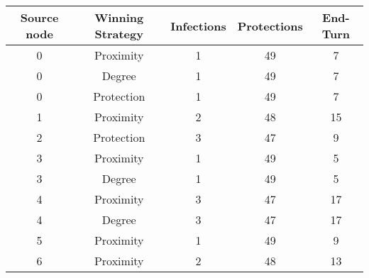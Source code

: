 \documentclass[results.tex]{subfiles}
\begin{document}
    \begin{center}
        \begin{tabular}{| c || c | c | c | c |}
            \hline
            {\bfseries Source node} & {\bfseries Winning Strategy} & {\bfseries Infections} & {\bfseries Protections}
            & {\bfseries End-Turn}
            \\  %
            \hline\hline
            0                       & Proximity                    & 1                      & 49                      & 7                    \\
            \hline
            0                       & Degree                       & 1                      & 49                      & 7                    \\
            \hline
            0                       & Protection                   & 1                      & 49                      & 7                    \\
            \hline
            1                       & Proximity                    & 2                      & 48                      & 15                   \\
            \hline
            2                       & Protection                   & 3                      & 47                      & 9                    \\
            \hline
            3                       & Proximity                    & 1                      & 49                      & 5                    \\
            \hline
            3                       & Degree                       & 1                      & 49                      & 5                    \\
            \hline
            4                       & Proximity                    & 3                      & 47                      & 17                   \\
            \hline
            4                       & Degree                       & 3                      & 47                      & 17                   \\
            \hline
            5                       & Proximity                    & 1                      & 49                      & 9                    \\
            \hline
            6                       & Proximity                    & 2                      & 48                      & 13                   \\

\end{tabular}
\end{center}
\end{document}
